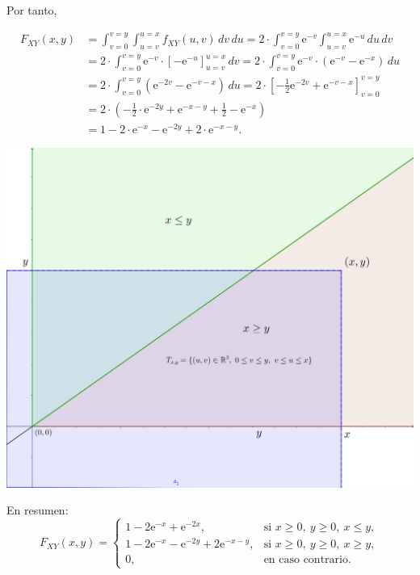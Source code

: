 \documentclass[]{book}
\begin{document}
Por tanto,

\[
\begin{array}{rl}
F_{XY}(x,y) &=  \int_{v=0}^{v=y}\int_{u=v}^{u=x} f_{XY}(u,v)\,dv\,du= 2\cdot\int_{v=0}^{v=y} \mathrm{e}^{-v}\int_{u=v}^{u=x} \mathrm{e}^{-u}\,du\,dv \\
&=  2 \cdot\int_{v=0}^{v=y} \mathrm{e}^{-v}\cdot\left[-\mathrm{e}^{-u}\right]_{u=v}^{u=x}\, dv  = 2 \cdot\int_{v=0}^{v=y} \mathrm{e}^{-v}\cdot (\mathrm{e}^{-v}-\mathrm{e}^{-x})\, du \\ 
&=  2 \cdot\int_{v=0}^{v=y} \left(\mathrm{e}^{-2v}-\mathrm{e}^{-v-x}\right)\, du=2 \cdot\left[-\frac{1}{2}\mathrm{e}^{-2v}+\mathrm{e}^{-v-x}\right]_{v=0}^{v=y}  
\\ &=  2\cdot\left(-\frac{1}{2}\cdot\mathrm{e}^{-2y}+\mathrm{e}^{-x-y}+\frac{1}{2}-\mathrm{e}^{-x}\right) \\&=  1-2\cdot\mathrm{e}^{-x}-\mathrm{e}^{-2y}+2\cdot\mathrm{e}^{-x-y}.
\end{array}
\]

\includegraphics{Images/Ejemplo2Bidi4.png}

En resumen:
\[
F_{XY}(x,y)=\begin{cases}
1-2\mathrm{e}^{-x}+\mathrm{e}^{-2x}, & \mbox{si }x\geq 0,\ y\geq 0,\ x\leq y,\\
1-2\mathrm{e}^{-x}-\mathrm{e}^{-2y}+2\mathrm{e}^{-x-y}, & \mbox{si }x\geq 0,\ y\geq 0,\ x\geq y,\\
0, & \mbox{en caso contrario.}
\end{cases}
\]
\end{document}
